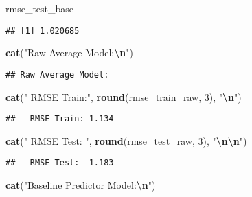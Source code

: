 \documentclass[
]{article}
\newenvironment{Shaded}{\begin{snugshade}}{\end{snugshade}}
\newcommand{\DecValTok}[1]{\textcolor[rgb]{0.00,0.00,0.81}{#1}}
\newcommand{\FunctionTok}[1]{\textcolor[rgb]{0.13,0.29,0.53}{\textbf{#1}}}
\newcommand{\NormalTok}[1]{#1}
\newcommand{\SpecialCharTok}[1]{\textcolor[rgb]{0.81,0.36,0.00}{\textbf{#1}}}
\newcommand{\StringTok}[1]{\textcolor[rgb]{0.31,0.60,0.02}{#1}}
\begin{document}
\begin{Shaded}
\begin{Highlighting}[]
\NormalTok{rmse\_test\_base}
\end{Highlighting}
\end{Shaded}

\begin{verbatim}
## [1] 1.020685
\end{verbatim}

\begin{Shaded}
\begin{Highlighting}[]
\FunctionTok{cat}\NormalTok{(}\StringTok{"Raw Average Model:}\SpecialCharTok{\textbackslash{}n}\StringTok{"}\NormalTok{)}
\end{Highlighting}
\end{Shaded}

\begin{verbatim}
## Raw Average Model:
\end{verbatim}

\begin{Shaded}
\begin{Highlighting}[]
\FunctionTok{cat}\NormalTok{(}\StringTok{"  RMSE Train:"}\NormalTok{, }\FunctionTok{round}\NormalTok{(rmse\_train\_raw, }\DecValTok{3}\NormalTok{), }\StringTok{"}\SpecialCharTok{\textbackslash{}n}\StringTok{"}\NormalTok{)}
\end{Highlighting}
\end{Shaded}

\begin{verbatim}
##   RMSE Train: 1.134
\end{verbatim}

\begin{Shaded}
\begin{Highlighting}[]
\FunctionTok{cat}\NormalTok{(}\StringTok{"  RMSE Test: "}\NormalTok{, }\FunctionTok{round}\NormalTok{(rmse\_test\_raw, }\DecValTok{3}\NormalTok{), }\StringTok{"}\SpecialCharTok{\textbackslash{}n\textbackslash{}n}\StringTok{"}\NormalTok{)}
\end{Highlighting}
\end{Shaded}

\begin{verbatim}
##   RMSE Test:  1.183
\end{verbatim}

\begin{Shaded}
\begin{Highlighting}[]
\FunctionTok{cat}\NormalTok{(}\StringTok{"Baseline Predictor Model:}\SpecialCharTok{\textbackslash{}n}\StringTok{"}\NormalTok{)}
\end{Highlighting}
\end{Shaded}
\end{document}
